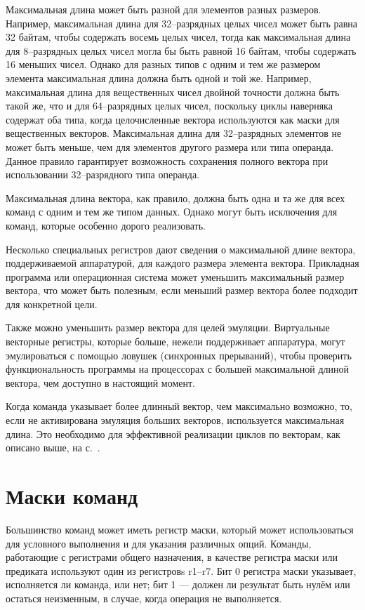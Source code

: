 \documentclass[forwardcom.tex]{subfiles}
\begin{document}
Максимальная длина может быть разной для элементов разных размеров. Например, максимальная длина для 32--разрядных целых чисел может быть равна 32 байтам, чтобы содержать восемь целых чисел, тогда как максимальная длина для 8--разрядных целых чисел могла бы быть равной 16 байтам, чтобы содержать 16 меньших чисел. Однако для разных типов с одним и тем же размером элемента максимальная длина должна быть одной и той же. Например, максимальная длина для вещественных чисел двойной точности должна быть такой же, что и для 64--разрядных целых чисел, поскольку циклы наверняка содержат оба типа, когда целочисленные вектора используются как маски для вещественных векторов. Максимальная длина для 32--разрядных элементов не может быть меньше, чем для элементов другого размера или типа операнда. Данное правило гарантирует возможность сохранения полного вектора при использовании 32--разрядного типа операнда.

Максимальная длина вектора, как правило, должна быть одна и та же для всех команд с одним и тем же типом данных. Однако могут быть исключения для команд, которые особенно дорого реализовать.

Несколько специальных регистров дают сведения о максимальной длине вектора, поддерживаемой аппаратурой, для каждого размера элемента вектора. Прикладная программа или операционная система может уменьшить максимальный размер вектора, что может быть полезным, если меньший размер вектора более подходит для конкретной цели.

Также можно уменьшить размер вектора для целей эмуляции. Виртуальные векторные регистры, которые больше, нежели поддерживает аппаратура, могут эмулироваться с помощью ловушек (синхронных прерываний), чтобы проверить функциональность программы на процессорах с большей максимальной длиной вектора, чем доступно в настоящий момент.

Когда команда указывает более длинный вектор, чем максимально возможно, то, если не активирована эмуляция больших векторов, используется максимальная длина. Это необходимо для эффективной реализации циклов по векторам, как описано выше, на с.~\pageref{vectorLoops}.

\section{Маски команд}
Большинство команд может иметь регистр маски, который может использоваться для условного выполнения и для указания различных опций. Команды, работающие с регистрами общего назначения, в качестве регистра маски или предиката используют один из регистровs r1--r7. Бит 0 регистра маски указывает, исполняется ли команда, или нет; бит 1 --- должен ли результат быть нулём или остаться неизменным, в случае, когда операция не выполняется.
\end{document}
